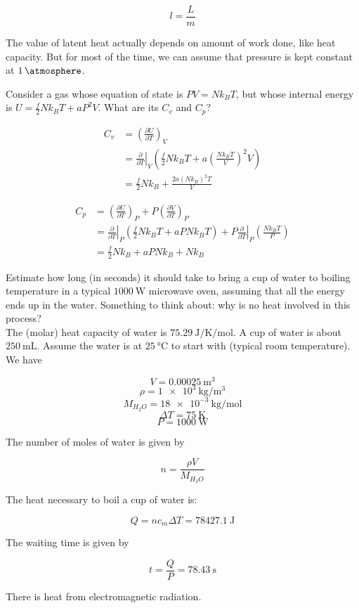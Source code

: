 \documentclass[12pt, a4paper]{article}
\newcounter{exa}
\begin{document}
\[l=\frac{L}{m}\]

The value of latent heat actually depends on amount of work done, like heat capacity. But for most of the time, we can assume that pressure is kept constant at $\SI{1}{\atmosphere}$.

\begin{texample}
Consider a gas whose equation of state is $PV=Nk_BT$, but whose internal energy is $U=\frac{f}{2}Nk_BT+aP^2V$. What are its $C_v$ and $C_p$?

\begin{align*}
C_v&=\left( \frac{\partial U}{\partial T} \right)_V \\
&=\left.\frac{\partial}{\partial T}\right\vert_V \left( \frac{f}{2}Nk_BT+a\left( \frac{Nk_BT}{V} \right)^2V \right) \\
&=\frac{f}{2}Nk_B+\frac{2a(Nk_B)^2T}{V}
\end{align*}

\begin{align*}
C_p&=\left( \frac{\partial U}{\partial T} \right)_P+P\left( \frac{\partial V}{\partial T} \right)_P \\
&=\left.\frac{\partial}{\partial T}\right\vert_P \left( \frac{f}{2}Nk_BT+aPNk_BT \right)+P\left.\frac{\partial}{\partial T}\right\vert_P \left( \frac{Nk_BT}{P} \right) \\
&=\frac{f}{2}Nk_B+aPNk_B+Nk_B
\end{align*}
\end{texample}

\begin{texample}
Estimate how long (in seconds) it should take to bring a cup of water to boiling temperature in a typical $\SI{1000}{\watt}$ microwave oven, assuming that all the energy ends up in the water. Something to think about: why is no heat involved in this process? \\

The (molar) heat capacity of water is $\SI{75.29}{\joule\per\kelvin\per\mole}$. A cup of water is about $\SI{250}{\milli\liter}$. Assume the water is at $\SI{25}{\celsius}$ to start with (typical room temperature). \\

We have

\[V=\SI{0.00025}{\cubic\meter}\]
\[\rho=\SI{1e3}{\kilo\gram\per\cubic\meter}\]
\[M_{H_2O}=\SI{18e-3}{\kilo\gram\per\mole}\]
\[\Delta T=\SI{75}{\kelvin}\]
\[P=\SI{1000}{\watt}\]

The number of moles of water is given by

\[n=\frac{\rho V}{M_{H_2O}}\]

The heat necessary to boil a cup of water is:

\[Q=nc_m \Delta T=\SI{78427.1}{\joule}\]

The waiting time is given by

\[t=\frac{Q}{P}=\SI{78.43}{\second}\]

There is heat from electromagnetic radiation.
\end{texample}
\end{document}

